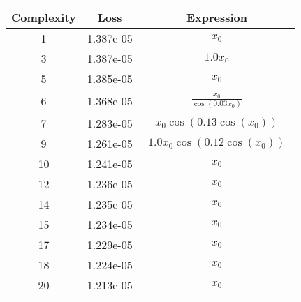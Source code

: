 \begin{center}
        \begin{tabular}{|c|c|c|}
        \hline
        Complexity & Loss & Expression \\
        \hline
        1 & 1.387e-05 & $\begin{aligned}x_{0}\end{aligned}$\\ \hline3 & 1.387e-05 & $\begin{aligned}1.0 x_{0}\end{aligned}$\\ \hline5 & 1.385e-05 & $\begin{aligned}x_{0}\end{aligned}$\\ \hline6 & 1.368e-05 & $\begin{aligned}\frac{x_{0}}{\cos{\left(0.03 x_{0} \right)}}\end{aligned}$\\ \hline7 & 1.283e-05 & $\begin{aligned}x_{0} \cos{\left(0.13 \cos{\left(x_{0} \right)} \right)}\end{aligned}$\\ \hline9 & 1.261e-05 & $\begin{aligned}1.0 x_{0} \cos{\left(0.12 \cos{\left(x_{0} \right)} \right)}\end{aligned}$\\ \hline10 & 1.241e-05 & $\begin{aligned}x_{0}\end{aligned}$\\ \hline12 & 1.236e-05 & $\begin{aligned}x_{0}\end{aligned}$\\ \hline14 & 1.235e-05 & $\begin{aligned}x_{0}\end{aligned}$\\ \hline15 & 1.234e-05 & $\begin{aligned}x_{0}\end{aligned}$\\ \hline17 & 1.229e-05 & $\begin{aligned}x_{0}\end{aligned}$\\ \hline18 & 1.224e-05 & $\begin{aligned}x_{0}\end{aligned}$\\ \hline20 & 1.213e-05 & $\begin{aligned}x_{0}\end{aligned}$\\ \hline\end{tabular}
        \end{center}
        